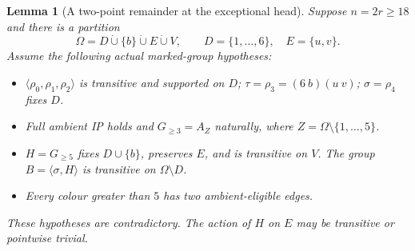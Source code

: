 \documentclass[11pt,a4paper]{article}
\newtheorem{lemma}{Lemma}
\newcommand{\gen}[1]{\langle#1\rangle}
\begin{document}
\begin{lemma}[A two-point remainder at the exceptional head]\label{pair}
Suppose $n=2r\ge18$ and there is a partition
\[
       \Omega=D\mathbin{\dot\cup}\{b\}
                    \mathbin{\dot\cup}E\mathbin{\dot\cup}V,
       \qquad D=\{1,\ldots,6\},\quad E=\{u,v\}.
\]
Assume the following actual marked-group hypotheses:
\begin{itemize}
\item $\gen{\rho_0,\rho_1,\rho_2}$ is transitive and supported
on $D$; $\tau=\rho_3=(6\ b)(u\ v)$; $\sigma=\rho_4$ fixes $D$.
\item Full ambient IP holds and $G_{\ge3}=A_Z$ naturally,
where $Z=\Omega\setminus\{1,\ldots,5\}$.
\item $H=G_{\ge5}$ fixes $D\cup\{b\}$, preserves $E$,
and is transitive on $V$. The group
$B=\gen{\sigma,H}$ is transitive on $\Omega\setminus D$.
\item Every colour greater than $5$ has two ambient-eligible edges.
\end{itemize}
These hypotheses are contradictory. The action of $H$ on $E$
may be transitive or pointwise trivial.
\end{lemma}
\end{document}
